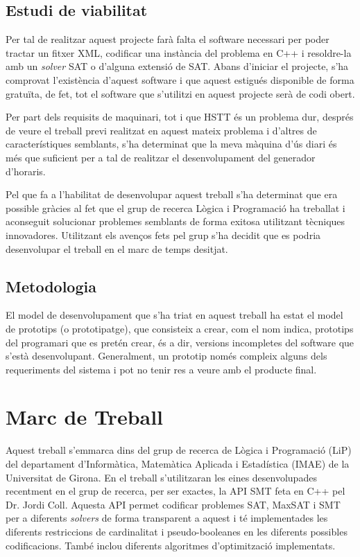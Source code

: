 \documentclass[11pt,a4paper,oneside]{article}
\begin{document}
  \subsection{Estudi de viabilitat}
  Per tal de realitzar aquest projecte farà falta el software necessari per poder tractar un fitxer XML, codificar una instància del problema en C++ i resoldre-la amb un \textit{solver} SAT o d'alguna extensió de SAT. 
  Abans d'iniciar el projecte, s'ha comprovat l'existència d'aquest software i que aquest estigués disponible de forma gratuïta, de fet, tot el software que s'utilitzi en aquest projecte serà de codi obert.

  Per part dels requisits de maquinari, tot i que HSTT és un problema dur, 
  després de veure el treball previ realitzat en aquest mateix problema i d'altres de característiques semblants, s'ha determinat que la meva màquina d'ús diari és més que suficient per a tal de realitzar el desenvolupament del generador d'horaris.

  Pel que fa a l'habilitat de desenvolupar aquest treball s'ha determinat que era possible gràcies al fet que
  el grup de recerca Lògica i Programació ha treballat i aconseguit solucionar problemes semblants de forma exitosa utilitzant tècniques innovadores. 
  Utilitzant els avenços fets pel grup s'ha decidit que es podria desenvolupar el treball en el marc de temps desitjat.

  \subsection{Metodologia}

  El model de desenvolupament que s'ha triat en aquest treball ha estat el model de prototips (o prototipatge), 
  que consisteix a crear, com el nom indica, prototips del programari que es pretén crear, és a dir, versions incompletes del software que s'està desenvolupant.
  Generalment, un prototip només compleix alguns dels requeriments del sistema i pot no tenir res a veure amb el producte final.
  
  \section{Marc de Treball}
   Aquest treball s'emmarca dins del grup de recerca de Lògica i Programació (LiP) del departament d'Informàtica, Matemàtica Aplicada i Estadística (IMAE) de la Universitat de Girona. 
    En el treball s'utilitzaran les eines desenvolupades recentment en el grup de recerca, per ser exactes, la API SMT feta en C++ pel Dr. Jordi Coll. 
    Aquesta API permet codificar problemes SAT, MaxSAT i SMT per a diferents \textit{solvers} de forma transparent a aquest i té implementades les diferents restriccions de cardinalitat i pseudo-booleanes en les diferents possibles codificacions. 
    També inclou diferents algoritmes d'optimització implementats.
\end{document}
